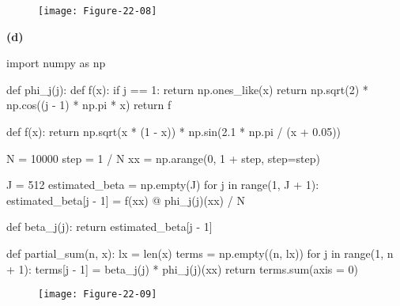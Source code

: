 \begin{figure}[H]
\texttt{[image: Figure-22-08]}
\end{figure}

\textbf{(d)}

\begin{python}
import numpy as np

def phi_j(j):
    def f(x):
        if j == 1:
            return np.ones_like(x)
        return np.sqrt(2) * np.cos((j - 1) * np.pi * x)
    return f

def f(x):
    return np.sqrt(x * (1 - x)) * np.sin(2.1 * np.pi / (x + 0.05))
\end{python}

\begin{python}
N = 10000
step = 1 / N
xx = np.arange(0, 1 + step, step=step)

J = 512
estimated_beta = np.empty(J)
for j in range(1, J + 1):
    estimated_beta[j - 1] = f(xx) @ phi_j(j)(xx) / N
    
def beta_j(j):
    return estimated_beta[j - 1]

def partial_sum(n, x):
    lx = len(x)
    terms = np.empty((n, lx))
    for j in range(1, n + 1):
        terms[j - 1] = beta_j(j) * phi_j(j)(xx)
    return terms.sum(axis = 0)
\end{python}


\begin{figure}[H]
\texttt{[image: Figure-22-09]}
\end{figure}

